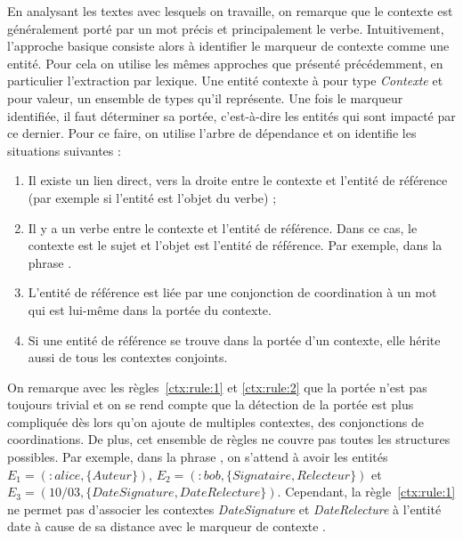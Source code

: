 En analysant les textes avec lesquels on travaille, on remarque que le contexte est généralement porté par un mot précis et principalement le verbe.
Intuitivement, l'approche basique consiste alors à identifier le marqueur de contexte comme une entité.
Pour cela on utilise les mêmes approches que présenté précédemment, en particulier l'extraction par lexique.
Une entité contexte à pour type \emph{Contexte} et pour valeur, un ensemble de types qu'il représente.
Une fois le marqueur identifiée, il faut déterminer sa portée, c'est-à-dire les entités qui sont impacté par ce dernier.
Pour ce faire, on utilise l'arbre de dépendance et on identifie les situations suivantes :
\begin{enumerate}
    \item Il existe un lien direct, vers la droite entre le contexte et l'entité de référence (par exemple si l'entité est l'objet du verbe) ;

    \item Il y a un verbe entre le contexte et l'entité de référence.
          Dans ce cas, le contexte est le sujet et l'objet est l'entité de référence.
          Par exemple, dans la phrase .

    \item L'entité de référence est liée par une conjonction de coordination à un mot qui est lui-même dans la portée du contexte. \label{ctx:rule:1}

    \item Si une entité de référence se trouve dans la portée d'un contexte, elle hérite aussi de tous les contextes conjoints. \label{ctx:rule:2}
\end{enumerate}

On remarque avec les règles~\ref{ctx:rule:1} et \ref{ctx:rule:2} que la portée n'est pas toujours trivial et on se rend compte que la détection de la portée est plus compliquée dès lors qu'on ajoute de multiples contextes, des conjonctions de coordinations.
De plus, cet ensemble de règles ne couvre pas toutes les structures possibles.
Par exemple, dans la phrase , on s'attend à avoir les entités $E_1 = (:alice, \{Auteur\})$, $E_2 = (:bob, \{Signataire, Relecteur\})$ et $E_3 = (10/03, \{DateSignature, DateRelecture\})$.
Cependant, la règle~\ref{ctx:rule:1} ne permet pas d'associer les contextes \emph{DateSignature} et \emph{DateRelecture} à l'entité date à cause de sa distance avec le marqueur de contexte .

